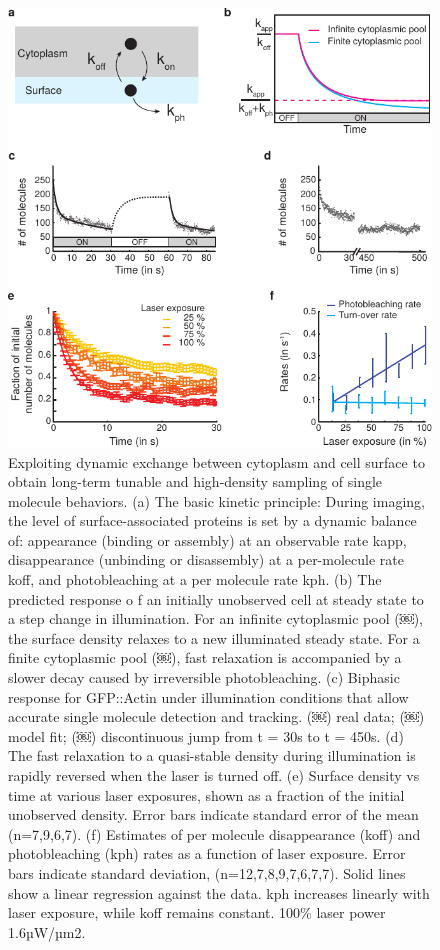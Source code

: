  \begin{figure}[h!]
 	\centering
 	\includegraphics[width=0.6\hsize]{nmeth/Fig2}
 	\caption{\label{fig:fig2} Exploiting dynamic exchange between cytoplasm and cell surface to obtain long-term tunable and high-density sampling of single molecule behaviors. (a) The basic kinetic principle: During imaging, the level of surface-associated proteins is set by a dynamic balance of: appearance (binding or assembly) at an observable rate kapp, disappearance (unbinding or disassembly) at a per-molecule rate koff, and photobleaching at a per molecule rate kph. (b) The predicted response o f an initially unobserved cell at steady state to a step change in illumination. For an infinite cytoplasmic pool (￼), the surface density relaxes to a new illuminated steady state. For a finite cytoplasmic pool (￼), fast relaxation is accompanied by a slower decay caused by irreversible photobleaching. (c) Biphasic response for GFP::Actin under illumination conditions that allow accurate single molecule detection and tracking. (￼) real data; (￼) model fit; (￼) discontinuous jump from t = 30s to t = 450s. (d) The fast relaxation to a quasi-stable density during illumination is rapidly reversed when the laser is turned off. (e) Surface density vs time at various laser exposures, shown as a fraction of the initial unobserved density. Error bars indicate standard error of the mean (n=7,9,6,7). (f) Estimates of per molecule disappearance (koff) and photobleaching (kph) rates as a function of laser exposure. Error bars indicate standard deviation, (n=12,7,8,9,7,6,7,7). Solid lines show a linear regression against the data. kph increases linearly with laser exposure, while koff remains constant. 100\% laser power ~ 1.6µW/µm2.}
 \end{figure}
 
